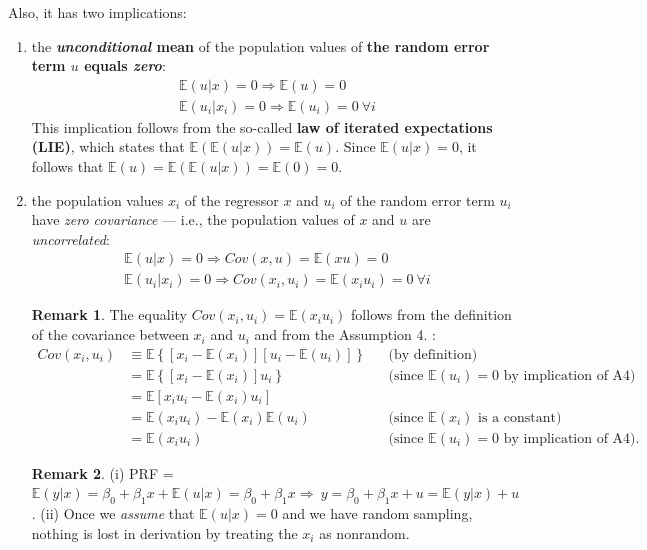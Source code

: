 \documentclass[a4paper, 10pt]{article}
\theoremstyle{definition}	%
\newtheorem*{remark}{Remark}
\begin{document}
Also, it has two implications:
\begin{enumerate}
    \item the \textbf{\textit{unconditional} mean} of the population values of \textbf{the random error term $u$ equals \textit{zero}}:
    \begin{align*}
        &\mathbb{E}(u|x) = 0 \Rightarrow \mathbb{E}(u) = 0 \\
        &\mathbb{E}(u_i|x_i) = 0 \Rightarrow \mathbb{E}(u_i) = 0 \ \forall i
    \end{align*}
    This implication follows from the so-called \textbf{law of iterated expectations (LIE)}, which states that $\mathbb{E}\left(\mathbb{E}(u|x)\right) = \mathbb{E}(u)$. Since $\mathbb{E}(u|x) = 0$, it follows that $\mathbb{E}(u) = \mathbb{E}\left(\mathbb{E}(u|x)\right) = \mathbb{E}(0) = 0$.
    \item the population values $x_i$ of the regressor $x$ and $u_i$ of the random error term $u_i$ have \textit{zero covariance} --- i.e., the population values of $x$ and $u$ are \textit{uncorrelated}:
    \begin{align*}
        &\mathbb{E}(u|x) = 0 \Rightarrow Cov(x,u) = \mathbb{E}(xu) = 0 \\
        &\mathbb{E}(u_i|x_i) = 0 \Rightarrow Cov(x_i,u_i) = \mathbb{E}(x_i u_i) = 0 \ \forall i
    \end{align*}
    \begin{remark}
        The equality $Cov(x_i,u_i) = \mathbb{E}(x_i u_i)$ follows from the definition of the covariance between $x_i$ and $u_i$ and from the Assumption 4. :
        \begin{align*}
            Cov(x_i, u_i) &\equiv \mathbb{E} \left\{ \left[ x_i - \mathbb{E}(x_i) \right] \left[ u_i - \mathbb{E}(u_i) \right] \right\} 
            && \text{(by definition)} \\
            &= \mathbb{E} \left\{ \left[ x_i - \mathbb{E}(x_i) \right] u_i \right\} 
            && \text{(since } \mathbb{E}(u_i) = 0 \text{ by implication of A4)} \\
            &= \mathbb{E} \left[ x_i u_i - \mathbb{E}(x_i) u_i \right] \\
            &= \mathbb{E}(x_i u_i) - \mathbb{E}(x_i) \mathbb{E}(u_i) 
            && \text{(since } \mathbb{E}(x_i) \text{ is a constant)} \\
            &= \mathbb{E}(x_i u_i) 
            && \text{(since } \mathbb{E}(u_i) = 0 \text{ by implication of A4)}.
        \end{align*}
    \end{remark}
    \begin{remark}
    (i) PRF = $\mathbb{E}(y|x) = \beta_0 + \beta_1 x + \mathbb{E}(u|x) = \beta_0 +\beta_1 x \Rightarrow\  y = \beta_0 + \beta_1 x + u = \mathbb{E}(y|x) + u$.
    (ii) Once we \textit{assume} that $\mathbb{E}(u|x) = 0$ and we have random sampling, nothing is lost in derivation by treating the $x_i$ as nonrandom.
    \end{remark}
\end{enumerate}
\end{document}
